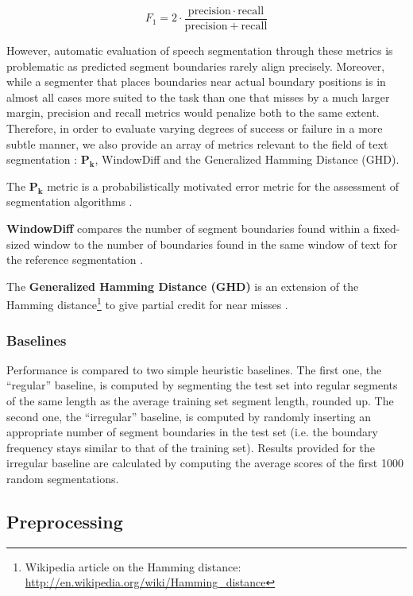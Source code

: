 \[
    F_1 = 2 \cdot \frac{\mathrm{precision} \cdot \mathrm{recall}}{\mathrm{precision} + \mathrm{recall}}
\]

However, automatic evaluation of speech segmentation through these metrics is problematic as predicted segment boundaries rarely align precisely. Moreover, while a segmenter that places boundaries near actual boundary positions is in almost all cases more suited to the task than one that misses by a much larger margin, precision and recall metrics would penalize both to the same extent. Therefore, in order to evaluate varying degrees of success or failure in a more subtle manner, we also provide an array of metrics relevant to the field of text segmentation : $\bm{P_{k}}$, WindowDiff and the Generalized Hamming Distance (GHD).

The $\bm{P_{k}}$ metric is a probabilistically motivated error metric for the assessment of segmentation algorithms \cite{beeferman1999statistical}.

\textbf{WindowDiff} compares the number of segment boundaries found within a fixed-sized window to the number of boundaries found in the same window of text for the reference segmentation \cite{pevzner2002critique}.

The \textbf{Generalized Hamming Distance (GHD)} is an extension of the Hamming distance\footnote{Wikipedia article on the Hamming distance: \url{http://en.wikipedia.org/wiki/Hamming_distance}} to give partial credit for near misses \cite{bookstein2002generalized}.

\subsubsection{Baselines}

Performance is compared to two simple heuristic baselines. The first one, the ``regular'' baseline, is computed by segmenting the test set into regular segments of the same length as the average training set segment length, rounded up. The second one, the ``irregular'' baseline, is computed by randomly inserting an appropriate number of segment boundaries in the test set (i.e. the boundary frequency stays similar to that of the training set). Results provided for the irregular baseline are calculated by computing the average scores of the first 1000 random segmentations.


\subsection{Preprocessing}

